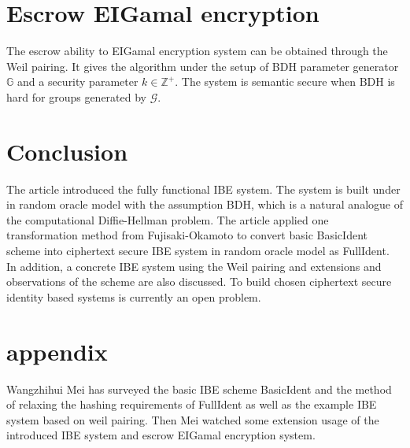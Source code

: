 \documentclass[runningheads,a4paper]{llncs}
\begin{document}
\section{Escrow EIGamal encryption}
The escrow ability to EIGamal encryption system can be obtained through the Weil pairing. It gives the algorithm under the setup of BDH parameter generator $\mathbb{G}$ and a security parameter $k \in \mathbb{Z}^+$. The system is semantic secure when BDH is hard for groups generated by $\mathcal{G}$.

\section{Conclusion}
The article introduced the fully functional IBE system. The system is built under in random oracle model with the assumption BDH, which is a natural analogue of the computational Diffie-Hellman problem. The article applied one transformation method from Fujisaki-Okamoto to convert basic BasicIdent scheme into ciphertext secure IBE system in random oracle model as FullIdent. In addition, a concrete IBE system using the Weil pairing and extensions and observations of the scheme are also discussed. To build chosen ciphertext secure identity based systems is currently an open problem.

\section{appendix}
Wangzhihui Mei has surveyed the basic IBE scheme BasicIdent and the method of relaxing the hashing requirements of FullIdent as well as the example IBE system based on weil pairing. Then Mei watched some extension usage of the introduced IBE system and escrow EIGamal encryption system.
\end{document}
